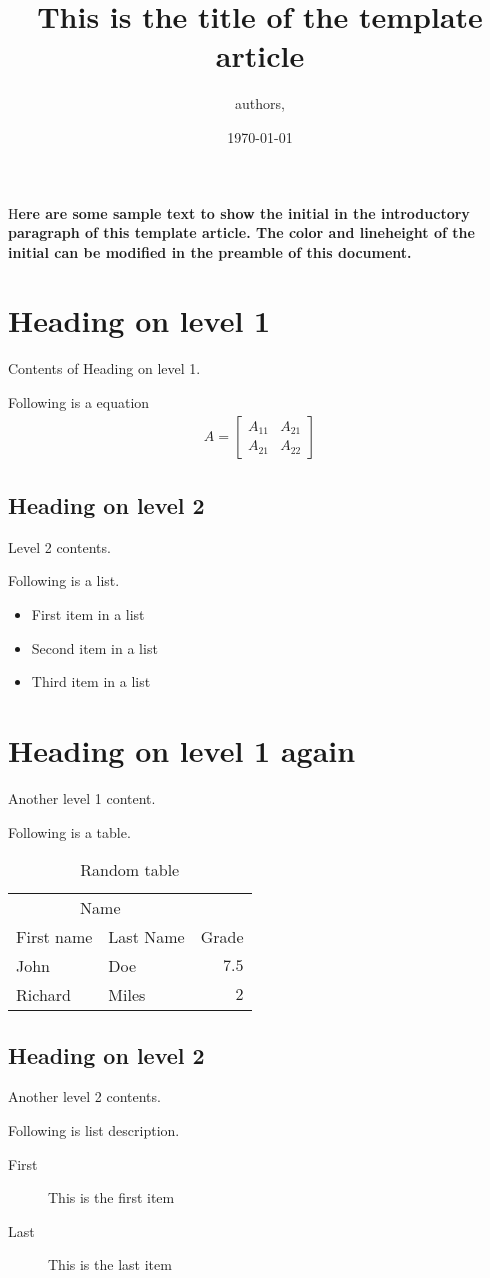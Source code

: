 \documentclass[	DIV=calc, paper=letter, fontsize=11pt,twocolumn]{scrartcl} %
\title{This is the title of the template article}		%
\author{authors, }											%
\date{\today}
\newcommand{\initial}[1]{%
     \lettrine[lines=3,lhang=0.2,nindent=0em]{
     				\color{DarkGoldenrod}
     				{\textsf{#1}}}{}}
\begin{document}
\maketitle
\thispagestyle{fancy} 			%
\initial{H}\textbf{ere are some sample text to show the initial in the introductory paragraph of this template article. The color and lineheight of the initial can be modified in the preamble of this document.}

\section*{Heading on level 1}

Contents of Heading on level 1.

Following is a equation
\begin{align}
	A = 
	\begin{bmatrix}
	A_{11} & A_{21} \\
  	A_{21} & A_{22}
	\end{bmatrix}
\end{align}

\subsection*{Heading on level 2}

Level 2 contents.

Following is a list.
\begin{itemize}
	\item First item in a list 
	\item Second item in a list 
	\item Third item in a list
\end{itemize}


\section*{Heading on level 1 again}

Another level 1 content.

Following is a table.
\begin{table}
\caption{Random table}
\centering
	\begin{tabular}{llr}
		\toprule
		\multicolumn{2}{c}{Name} \\
		\cmidrule(r){1-2}
			First name & Last Name & Grade \\
		\midrule
			John & Doe & $7.5$ \\
			Richard & Miles & $2$ \\
		\bottomrule
	\end{tabular}
\end{table}

\subsection*{Heading on level 2}

Another level 2 contents.

Following is list description.
\begin{description}
	\item[First] This is the first item
	\item[Last] This is the last item
\end{description}
\end{document}
